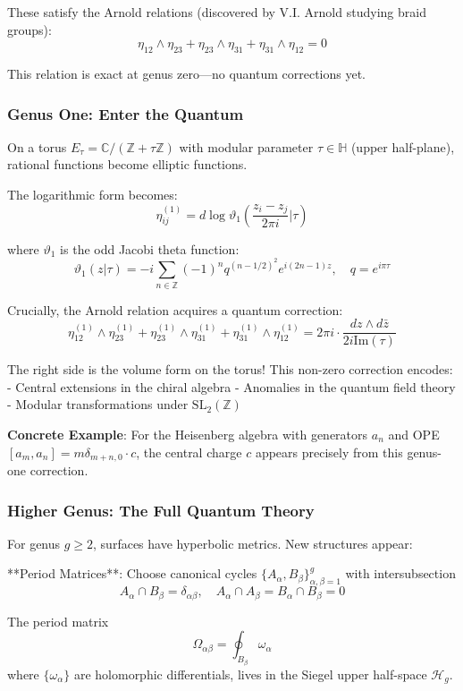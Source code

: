 These satisfy the Arnold relations (discovered by V.I. Arnold studying braid groups):
$$\eta_{12} \wedge \eta_{23} + \eta_{23} \wedge \eta_{31} + \eta_{31} \wedge \eta_{12} = 0$$

This relation is exact at genus zero—no quantum corrections yet.

\subsubsection{Genus One: Enter the Quantum}

On a torus $E_\tau = \mathbb{C}/(\mathbb{Z} + \tau\mathbb{Z})$ with modular parameter $\tau \in \mathbb{H}$ (upper half-plane), rational functions become elliptic functions.

The logarithmic form becomes:
$$\eta_{ij}^{(1)} = d\log\vartheta_1\left(\frac{z_i - z_j}{2\pi i}\Big|\tau\right)$$

where $\vartheta_1$ is the odd Jacobi theta function:
$$\vartheta_1(z|\tau) = -i\sum_{n \in \mathbb{Z}}(-1)^n q^{(n-1/2)^2}e^{i(2n-1)z}, \quad q = e^{i\pi\tau}$$

Crucially, the Arnold relation acquires a quantum correction:
$$\eta_{12}^{(1)} \wedge \eta_{23}^{(1)} + \eta_{23}^{(1)} \wedge \eta_{31}^{(1)} + \eta_{31}^{(1)} \wedge \eta_{12}^{(1)} = 2\pi i \cdot \frac{dz \wedge d\bar{z}}{2i\text{Im}(\tau)}$$

The right side is the volume form on the torus! This non-zero correction encodes:
- Central extensions in the chiral algebra
- Anomalies in the quantum field theory
- Modular transformations under $\text{SL}_2(\mathbb{Z})$

\textbf{Concrete Example}: For the Heisenberg algebra with generators $a_n$ and OPE $[a_m, a_n] = m\delta_{m+n,0} \cdot c$, the central charge $c$ appears precisely from this genus-one correction.

\subsubsection{Higher Genus: The Full Quantum Theory}

For genus $g \geq 2$, surfaces have hyperbolic metrics. New structures appear:

**Period Matrices**: Choose canonical cycles $\{A_\alpha, B_\beta\}_{\alpha,\beta=1}^g$ with intersubsection
$$A_\alpha \cap B_\beta = \delta_{\alpha\beta}, \quad A_\alpha \cap A_\beta = B_\alpha \cap B_\beta = 0$$

The period matrix
$$\Omega_{\alpha\beta} = \oint_{B_\beta} \omega_\alpha$$
where $\{\omega_\alpha\}$ are holomorphic differentials, lives in the Siegel upper half-space $\mathcal{H}_g$.

